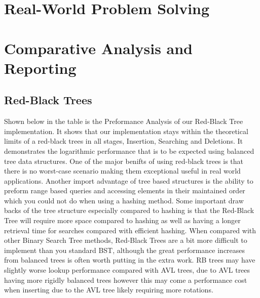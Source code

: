 \documentclass[12pt]{amsart}
\begin{document}
\section{Real-World Problem Solving}


\section{Comparative Analysis and Reporting}

\subsection{Red-Black Trees}

    Shown below in the table is the Preformance Analysis of our Red-Black Tree implementation.
    It shows that our implementation stays within the theoretical limits of a red-black trees
    in all stages, Insertion, Searching and Deletions. It demonstrates the logarithmic performance
    that is to be expected using balanced tree data structures. One of the major benifts of 
    using red-black trees is that there is no worst-case scenario making them exceptional useful
    in real world applications. Another import advantage of tree based structures is the ability to
    preform range based queries and accessing elements in their maintained order which you could not 
    do when using a hashing method. Some important draw backs of the tree structure especially compared
    to hashing is that the Red-Black Tree will require more space compared to hashing as well as having
    a longer retrieval time for searches compared with efficient hashing. 
    When compared with other Binary Search Tree methods,
    Red-Black Trees are a bit more difficult to implement than you standard BST, although the great
    performance increases from balanced trees is often worth putting in the extra work. RB trees 
    may have slightly worse lookup performance compared with AVL trees, due to AVL trees having
    more rigidly balanced trees however this may come a performance cost when inserting due to the
    AVL tree likely requiring more rotations. 
\end{document}
